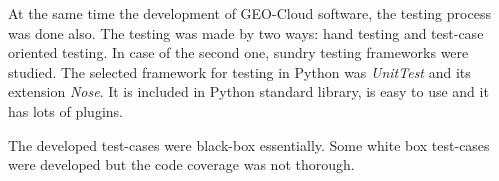 At the same time the development of GEO-Cloud software, the testing process was
done also. The testing was made by two ways: hand testing and test-case oriented
testing. In case of the second one, sundry testing frameworks were studied.
The selected framework for testing in Python was \emph{UnitTest} and its
extension \emph{Nose}. It is included in Python standard library, is easy to use
and it has lots of plugins. 

The developed test-cases were black-box essentially. Some white box test-cases
were developed but the code coverage was not thorough. 
